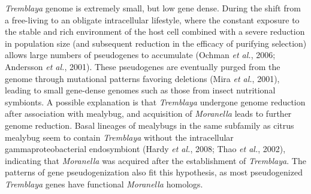 \documentclass[11pt]{article}
\begin{document}
\textit{Tremblaya} genome is extremely small, but low gene dense. 
During the shift from a free-living to an obligate intracellular lifestyle, where the constant exposure to the stable and rich environment of the host cell combined with a severe reduction in population size (and subsequent reduction in the efficacy of purifying selection) allows large numbers of pseudogenes to accumulate (Ochman \textit{et al.}, 2006; Andersson \textit{et al.}, 2001). 
These pseudogenes are eventually purged from the genome through mutational patterns favoring deletions (Mira \textit{et al.}, 2001), leading to small gene-dense genomes such as those from insect nutritional symbionts. 
A possible explanation is that \textit{Tremblaya} undergone genome reduction after association with mealybug, and acquisition of \textit{Moranella} leads to further genome reduction. 
Basal lineages of mealybugs in the same subfamily as citrus mealybug seem to contain \textit{Tremblaya} without the intracellular gammaproteobacterial endosymbiont (Hardy \textit{et al.}, 2008; Thao \textit{et al.}, 2002), indicating that \textit{Moranella} was acquired after the establishment of \textit{Tremblaya}. 
The patterns of gene pseudogenization also fit this hypothesis, as most pseudogenized \textit{Tremblaya} genes have functional \textit{Moranella} homologs.
\end{document}
